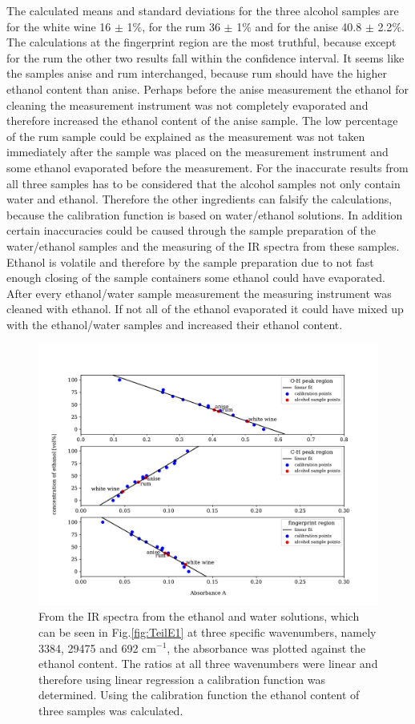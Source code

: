 \documentclass[a4paper,abstracton]{article}	                       %
\begin{document}
The calculated means and standard deviations for the three alcohol samples are for the white wine 16 $\pm$ 1$\%$, for the rum 36 $\pm$ 1$\%$ and for the anise 40.8 $\pm$ 2.2$\%$. 
The calculations at the fingerprint region are the most truthful, because except for the rum the other two results fall within the confidence interval. It seems like the samples anise and rum interchanged, because rum should have the higher ethanol content than anise. Perhaps before the anise measurement the ethanol for cleaning the measurement instrument was not completely evaporated and therefore increased the ethanol content of the anise sample. The low percentage of the rum sample could be explained as the measurement was not taken immediately after the sample was placed on the measurement instrument and some ethanol evaporated before the measurement. For the inaccurate results from all three samples has to be considered that the alcohol samples not only contain water and ethanol. Therefore the other ingredients can falsify the calculations, because the calibration function is based on water/ethanol solutions. In addition certain inaccuracies could be caused through the sample preparation of the water/ethanol samples and the measuring of the IR spectra from these samples. Ethanol is volatile and therefore by the sample preparation due to not fast enough closing of the sample containers some ethanol could have evaporated. After every ethanol/water sample measurement the measuring instrument was cleaned with ethanol. If not all of the ethanol evaporated it could have mixed up with the ethanol/water samples and increased their ethanol content. 

\begin{figure}[H]
\centering
 \includegraphics[width=\textwidth] {TeilE2.pdf}
\caption{\label{fig:TeilE2}From the IR spectra from the ethanol and water solutions, which can be seen in Fig.\ref{fig:TeilE1} at three specific wavenumbers, namely 3384, 29475 and 692 cm$^{-1}$, the absorbance was plotted against the ethanol content. The ratios at all three wavenumbers were linear and therefore using linear regression a calibration function was determined. Using the calibration function the ethanol content of three samples was calculated.}
\end{figure}
\clearpage
\end{document}
